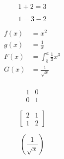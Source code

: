 \documentclass{article}
\begin{document}
\begin{equation*}
  1 + 2 = 3
\end{equation*}

\begin{equation*}
  1 = 3 - 2
\end{equation*}

\begin{align*}
  f(x) &= x^2\\
  g(x) &= \frac{1}{x}\\
  F(x) &= \int^a_b \frac{1}{3}x^3\\
  G(x) &= \frac{1}{\sqrt{x}}\\
\end{align*}

\[
\begin{matrix}
1 & 0\\
0 & 1
\end{matrix}
\]

\[
\left[
\begin{matrix}
2 & 1\\
1 & 2
\end{matrix}
\right]
\]

\[
\left(\frac{1}{\sqrt{x}}\right)
\]
\end{document}
